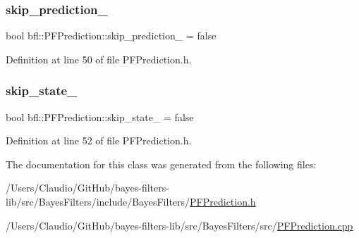 \subsubsection{\texorpdfstring{skip\+\_\+prediction\+\_\+}{skip\_prediction\_}}
{\footnotesize\ttfamily bool bfl\+::\+P\+F\+Prediction\+::skip\+\_\+prediction\+\_\+ = false\hspace{0.3cm}{\ttfamily [private]}}



Definition at line 50 of file P\+F\+Prediction.\+h.

\mbox{\label{classbfl_1_1PFPrediction_ac094202f89c8190257715b665f2c07ca}} 
\subsubsection{\texorpdfstring{skip\+\_\+state\+\_\+}{skip\_state\_}}
{\footnotesize\ttfamily bool bfl\+::\+P\+F\+Prediction\+::skip\+\_\+state\+\_\+ = false\hspace{0.3cm}{\ttfamily [private]}}



Definition at line 52 of file P\+F\+Prediction.\+h.



The documentation for this class was generated from the following files\+:\begin{DoxyCompactItemize}
\item 
/\+Users/\+Claudio/\+Git\+Hub/bayes-\/filters-\/lib/src/\+Bayes\+Filters/include/\+Bayes\+Filters/\mbox{\hyperlink{PFPrediction_8h}{P\+F\+Prediction.\+h}}\item 
/\+Users/\+Claudio/\+Git\+Hub/bayes-\/filters-\/lib/src/\+Bayes\+Filters/src/\mbox{\hyperlink{PFPrediction_8cpp}{P\+F\+Prediction.\+cpp}}\end{DoxyCompactItemize}

